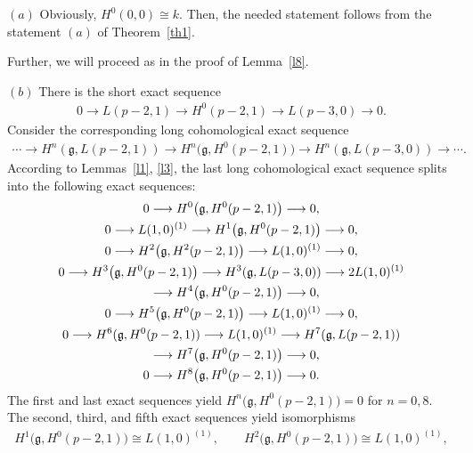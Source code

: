 \documentclass[10pt,a4paper]{amsart}
\numberwithin{equation}{section}
\begin{document}
 $(a)$ Obviously, $H^0(0,0)\cong k$. Then, the needed statement follows from the statement $(a)$ of Theorem~\ref{th1}.


Further, we will proceed as in the proof of Lemma~\ref{l8}.

$(b)$ There is the short exact sequence
\begin{gather*}
0\longrightarrow L(p-2,1)\longrightarrow H^0(p-2,1)\longrightarrow L(p-3,0)\longrightarrow 0.
\end{gather*}
Consider the corresponding long cohomological exact sequence
\begin{gather*}
\cdots \longrightarrow H^n(\mathfrak{g},L(p-2,1))\longrightarrow H^n\big(\mathfrak{g},H^0(p-2,1)\big)\longrightarrow
H^n(\mathfrak{g},L(p-3,0))\longrightarrow \cdots.
\end{gather*}
According to Lemmas~\ref{l1}, \ref{l3}, the last long cohomological exact sequence splits into the following exact sequences:
\begin{gather*}
0\longrightarrow H^0\big(\mathfrak{g},H^0(p-2,1)\big)\longrightarrow 0,
\\
0\longrightarrow L(1,0)^{(1)}\longrightarrow H^1\big(\mathfrak{g},H^0(p-2,1)\big)\longrightarrow 0,
\\
0\longrightarrow H^2\big(\mathfrak{g},H^2(p-2,1)\big)\longrightarrow L(1,0)^{(1)}\longrightarrow 0,
\\
0\longrightarrow H^3\big(\mathfrak{g},H^0(p-2,1)\big)\longrightarrow H^3(\mathfrak{g},L(p-3,0))\longrightarrow 2L(1,0)^{(1)}
\\ \hphantom{0}
{}\longrightarrow
H^4\big(\mathfrak{g},H^0(p-2,1)\big)\longrightarrow 0,
\\
0\longrightarrow H^5\big(\mathfrak{g},H^0(p-2,1)\big)\longrightarrow L(1,0)^{(1)}\longrightarrow 0,
\\
0\longrightarrow H^6(\mathfrak{g},H^0(p-2,1))\longrightarrow L(1,0)^{(1)}\longrightarrow H^7(\mathfrak{g},L(p-2,1))
\\ \hphantom{0}
{}\longrightarrow
H^7\big(\mathfrak{g},H^0(p-2,1)\big)\longrightarrow 0,
\\
0\longrightarrow H^8\big(\mathfrak{g},H^0(p-2,1)\big)\longrightarrow 0.
\end{gather*}
The first and last exact sequences yield $H^n\big(\mathfrak{g},H^0(p-2,1)\big)=0$ for $n=0,8$. The second, third, and fifth exact sequences yield isomorphisms
\begin{gather*}
H^1\big(\mathfrak{g},H^0(p-2,1)\big)\cong L(1,0)^{(1)},
\qquad
H^2\big(\mathfrak{g},H^0(p-2,1)\big)\cong L(1,0)^{(1)},
\end{gather*}
\end{document}
